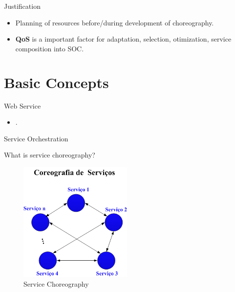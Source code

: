 \documentclass[xcolor=svgnames]{beamer}
\newenvironment{reference}[2]{%
  \begin{textblock*}{\textwidth}(#1,#2)
      \footnotesize\it\bgroup\color{red!50!black}}{\egroup\end{textblock*}}
\begin{document}
  \begin{frame}{Justification}
    	\begin{itemize}
          \item <1-> Planning of resources before/during development of choreography.
          \item <2->\textbf{QoS} is a important factor for adaptation, selection, otimization, service composition into SOC.
          
    	\end{itemize}
  \end{frame}



\section{Basic Concepts}
  \begin{frame}{Web Service}
    	\begin{itemize}
          \item <1-> .
          
    	\end{itemize}
  \end{frame}

  \begin{frame}{Service Orchestration}

  \end{frame}


    \begin{frame}{What is service choreography?}
      \begin{figure}[!h]
         \centering
         \includegraphics[width=0.5\textwidth]{figures/ChoreographyA.png}
         \caption{Service Choreography }
      \end{figure}	

    \end{frame}
\end{document}
